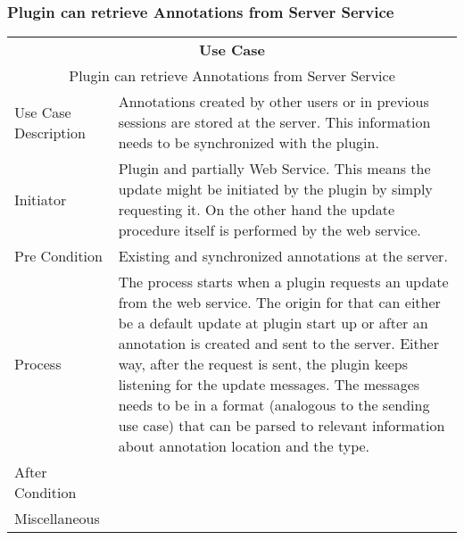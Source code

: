\subsubsection[Client: Receiving Annotations]{Plugin can retrieve Annotations from Server Service}
\begin{tabular}{|l| p{6cm} |}
\hline 
 \multicolumn{2}{|c|}{\textbf{Use Case }} \\ 
 \multicolumn{2}{|c|}{Plugin can retrieve Annotations from Server Service} \\ 
\hline 
Use Case Description & Annotations created by other users or in previous sessions are stored at the server. This information needs to be synchronized with the plugin.\\ 
\hline 
Initiator & Plugin and partially Web Service. This means the update might be initiated by the plugin by simply requesting it. On the other hand the update procedure itself is performed by the web service. \\ 
\hline 
Pre Condition & Existing and synchronized annotations at the server. \\ 
\hline 
Process & The process starts when a plugin requests an update from the web service. The origin for that can either be a default update at plugin start up or after an annotation is created and sent to the server. Either way, after the request is sent, the plugin keeps listening for the update messages. The messages needs to be in a format (analogous to the sending use case) that can be parsed to relevant information about annotation location and the type. \\ 
\hline 
After Condition & \\ 
\hline 
Miscellaneous & \\ 
\hline 
\end{tabular} 


